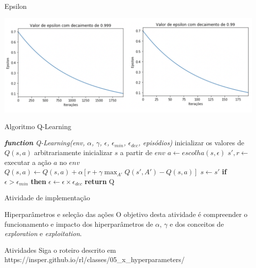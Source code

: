 \documentclass{beamer}
\begin{document}
\begin{frame}{Epsilon}
	  \begin{center}
		\includegraphics[width=\textwidth]{figuras/epsilon.png}
	\end{center}
\end{frame}

\begin{frame}{Algoritmo Q-Learning}
	
\begin{algorithmic} 
	\STATE \emph{\textbf{function} Q-Learning(env, $\alpha$, $\gamma$, $\epsilon$, $\epsilon_{min}$, $\epsilon_{dec}$, episódios)}
	\STATE inicializar os valores de $Q(s, a)$ arbitrariamente
	\STATE inicializar $s$ a partir de $env$
	\REPEAT
	\STATE $a \leftarrow escolha(s, \epsilon)$
	\STATE $s', r \leftarrow$ executar a ação $a$ no $env$
	\STATE $Q(s,a) \leftarrow Q(s,a) + \alpha [r +\gamma \max_{A'}{Q(s', A')} - Q(s,a)]$
	\STATE$s  \leftarrow s'$
	\STATE \textbf{if} $\epsilon > \epsilon_{min}$ \textbf{then} $\epsilon \leftarrow \epsilon \times \epsilon_{dec}$
	\ENDFOR
	\STATE \textbf{return} Q
\end{algorithmic}	
\end{frame}

\begin{frame}{Atividade de implementação}
		
	\begin{alertblock}{Hiperparâmetros e seleção das ações}
		O objetivo desta atividade é compreender o funcionamento e impacto dos hiperparâmetros de $\alpha$, $\gamma$ e dos conceitos de \textit{exploration} e \textit{exploitation}.
	\end{alertblock}
	
	\begin{block}{Atividades}
		Siga o roteiro descrito em https://insper.github.io/rl/classes/05\_x\_hyperparameters/ \href{https://insper.github.io/rl/classes/05_x_hyperparameters/}
		{}
	\end{block}

\end{frame}
\end{document}
